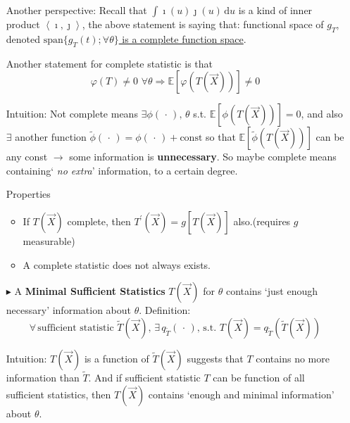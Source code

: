 \begin{itemize}
        Another perspective: Recall that $ \int \imath(u)\jmath(u)\,\mathrm{d}u $ is a kind of inner product $ \left\langle \imath,\jmath\right\rangle $, the above statement is saying that: functional space of $ g_T $, denoted \underline{$\mathrm{span}\{g_T(t);\forall\theta\}$ is a complete function space}. 

        Another statement for complete statistic is that
        \begin{equation}
            \varphi(T)\neq 0 \,\,\forall \theta\Rightarrow \mathbb{E}[\varphi(T(\vec{X}))]\neq 0  
        \end{equation}

        Intuition: Not complete means $ \exists \phi(\, \cdot \, ) ,\, \theta  $ s.t. $ \mathbb{E}\left[ \phi (T(\vec{X})) \right] =0 $, and also $ \exists $ another function $ \tilde{\phi }(\, \cdot \, )=\phi (\, \cdot \, )+\mathrm{const}  $ so that $ \mathbb{E}\left[ \tilde{\phi }(T(\vec{X})) \right]  $ can be any const $ \to $ some information is \textbf{unnecessary}. So maybe complete means containing` \textit{no extra}' information, to a certain degree.


        Properties
        \begin{itemize}[topsep=2pt,itemsep=0pt]
            \item If $T(\vec{X})$ complete, then $T^\prime(\vec{X})=g[T(\vec{X})]$ also.(requires $g$ measurable)

            \item A complete statistic does not always exists.
        \end{itemize}

        \item[$\blacktriangleright$] A \textbf{Minimal Sufficient Statistics} $ T(\vec{X}) $ for $ \theta $ contains `just enough necessary' information about $ \theta  $. Definition:
        \begin{equation}
            \forall\,\text{sufficient statistic }\tilde{T}(\vec{X}),\,\exists\, q_{\tilde{T}}(\, \cdot \, ),\, \text{s.t. } T(\vec{X})=q_{\tilde{T}}(\tilde{T}(\vec{X}))
        \end{equation} 
        
        Intuition: $ T(\vec{X}) $ is a function of $ \tilde{T}(\vec{X}) $ suggests that $ T $ contains no more information than $ \tilde{T} $. And if sufficient statistic $ T $ can be function of all sufficient statistics, then $ T(\vec{X}) $ contains `enough and minimal information' about $ \theta  $.


\end{itemize}
